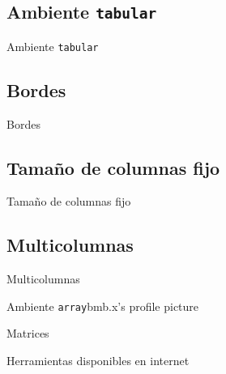 \documentclass[../slides.tex]{subfiles}
\begin{document}
    \begin{frame}
        \tableofcontents[sections=\value{section}]
    \end{frame}

    \subsection{Ambiente \texttt{tabular}}
    \begin{frame}{Ambiente \texttt{tabular}}
        
    \end{frame}

    \subsection{Bordes}
    
    \begin{frame}{Bordes}

    \end{frame}

    \subsection{Tamaño de columnas fijo}
    
    \begin{frame}{Tamaño de columnas fijo}

    \end{frame}
        
    \subsection{Multicolumnas}

    \begin{frame}{Multicolumnas}

    \end{frame}

    \begin{frame}{Ambiente \texttt{array}bmb.x's profile picture}

    \end{frame}

    \begin{frame}{Matrices}

    \end{frame}

    \begin{frame}{Herramientas disponibles en internet}

    \end{frame}
\end{document}
